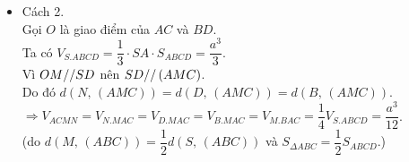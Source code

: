 \begin{ex}
{\begin{itemize}
\begin{center}
			\end{center}
			\item Cách 2.\\
			Gọi $ O$ là giao điểm của $ AC$ và $ BD$.\\
			Ta có $V_{S.ABCD}=\dfrac{1}{3}\cdot SA\cdot S_{ABCD}=\dfrac{a^3}{3}$.\\
			Vì $ OM{\rm{//}}SD$ nên $ SD{\rm{//}}\left(AMC\right)$.\\
			Do đó $ d\left(N,\,\left(AMC\right)\right)=d\left(D,\,\left(AMC\right)\right)=d\left(B,\,\left(AMC\right)\right)$.\\
			$\Rightarrow{V_{ACMN}}=V_{N.MAC}=V_{D.MAC}=V_{B.MAC}=V_{M.BAC}=\dfrac{1}{4}{V_{S.ABCD}}=\dfrac{a^3}{12}$.\\
			(do $ d\left(M,\,\left(ABC\right)\right)=\dfrac{1}{2}d\left(S,\,\left(ABC\right)\right)$ và $S_{\Delta ABC}=\dfrac{1}{2}{S_{ABCD}}$.)
		\end{itemize}	
	}
\end{ex}
